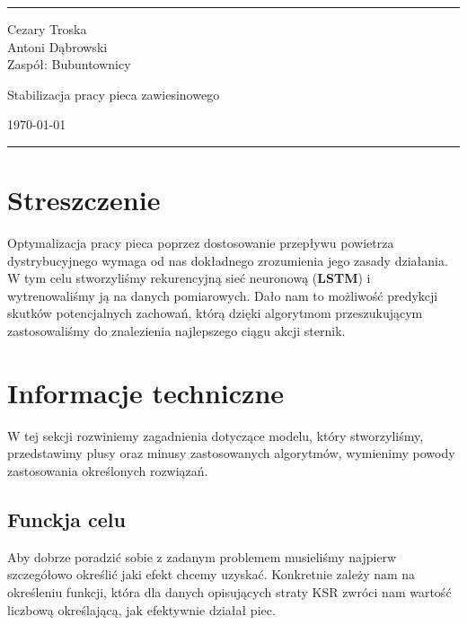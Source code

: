 \documentclass[a4paper]{article}
\begin{document}

\fancyhead[C]{}
\hrule \medskip %
\begin{minipage}{0.295\textwidth} 
\raggedright
\footnotesize   
Cezary Troska \hfill\\
Antoni Dąbrowski \hfill\\
Zaspół: Bubuntownicy
\end{minipage}
\begin{minipage}{0.4\textwidth} 
\centering 
\large 
Stabilizacja pracy pieca zawiesinowego\\ 
\normalsize 

\end{minipage}
\begin{minipage}{0.295\textwidth} 
\raggedleft
\today\hfill\\
\end{minipage}
\medskip\hrule 
\bigskip



\section{Streszczenie}
Optymalizacja pracy pieca poprzez dostosowanie przepływu powietrza dystrybucyjnego wymaga od nas dokładnego zrozumienia jego zasady działania. W tym celu stworzyliśmy rekurencyjną sieć neuronową (\textbf{LSTM}) i wytrenowaliśmy ją na danych pomiarowych. Dało nam to możliwość predykcji skutków potencjalnych zachowań, którą dzięki algorytmom przeszukującym zastosowaliśmy do znalezienia najlepszego ciągu akcji sternik. 

\section{Informacje techniczne}
W tej sekcji rozwiniemy zagadnienia dotyczące modelu, który stworzyliśmy, przedstawimy plusy oraz minusy zastosowanych algorytmów, wymienimy powody zastosowania określonych rozwiązań. 
\subsection{Funckja celu}
Aby dobrze poradzić sobie z zadanym problemem musieliśmy najpierw szczegółowo określić jaki efekt chcemy uzyskać. Konkretnie zależy nam na określeniu funkcji, która dla danych opisujących straty KSR zwróci nam wartość liczbową określającą, jak efektywnie działał piec.
\end{document}
